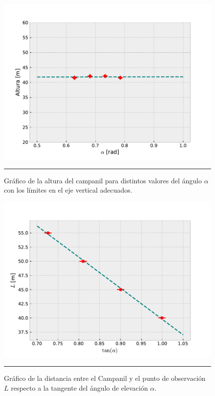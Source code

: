 \documentclass[10pt,a4paper]{article}
\begin{document}
\begin{multicols}{2}
	\begin{figure}[H]
		\centering
		\includegraphics[scale=0.5]{IMG/altura_2.pdf}
		\caption{Gráfico de la altura del campanil para distintos valores del ángulo $\alpha$ con los límites en el eje vertical adecuados.}
		\label{Grafico campanil ajustado}
		\rule{80mm}{0.1mm}
	\end{figure}
	
	\begin{figure}[H]
		\centering
		\includegraphics[scale=0.5]{IMG/proporcionalidad.pdf}
		\caption{Gráfico de la distancia entre el Campanil y el punto de observación $L$ respecto a la tangente del ángulo de elevación $\alpha$.}
		\label{Grafico de proporcionalidad}
		\rule{80mm}{0.1mm}
	\end{figure} 


\end{multicols}
\end{document}
